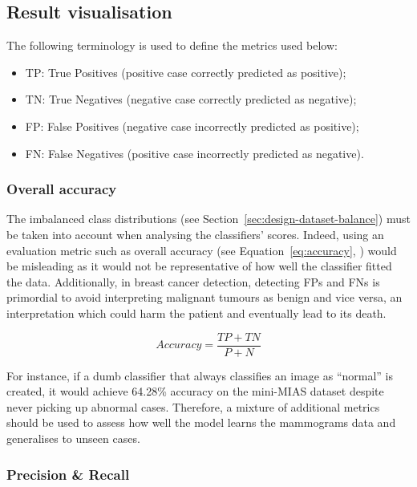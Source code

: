 
\subsection{Result visualisation}
\label{sec:design-results-visualisation}

The following terminology is used to define the metrics used below:
\begin{itemize}
    \item TP: True Positives (positive case correctly predicted as positive);
    \item TN: True Negatives (negative case correctly predicted as negative);
    \item FP: False Positives (negative case incorrectly predicted as positive);
    \item FN: False Negatives (positive case incorrectly predicted as negative).
\end{itemize}

\subsubsection{Overall accuracy}

The imbalanced class distributions (see Section~\ref{sec:design-dataset-balance}) must be taken into account when analysing the classifiers' scores. Indeed, using an evaluation metric such as overall accuracy (see Equation~\ref{eq:accuracy}, \cite{Falconi2019}) would be misleading as it would not be representative of how well the classifier fitted the data. Additionally, in breast cancer detection, detecting FPs and FNs is primordial to avoid interpreting malignant tumours as benign and vice versa, an interpretation which could harm the patient and eventually lead to its death.

\begin{equation}
\label{eq:accuracy}
    Accuracy = \frac{TP + TN}{P + N}
\end{equation}

For instance, if a dumb classifier that always classifies an image as ``normal'' is created, it would achieve 64.28\% accuracy on the mini-MIAS dataset despite  never picking up abnormal cases. Therefore, a mixture of additional metrics should be used to assess how well the model learns the mammograms data and generalises to unseen cases.

\subsubsection{Precision \& Recall}

